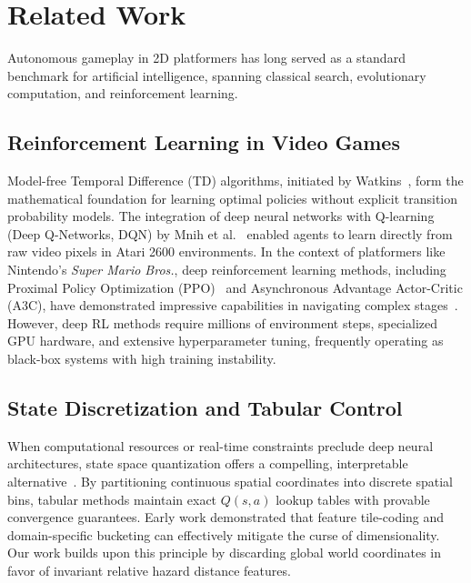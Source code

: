 \section{Related Work}
\label{sec:related}

Autonomous gameplay in 2D platformers has long served as a standard benchmark for artificial intelligence, spanning classical search, evolutionary computation, and reinforcement learning.

\subsection{Reinforcement Learning in Video Games}
Model-free Temporal Difference (TD) algorithms, initiated by Watkins~\cite{watkins1992q}, form the mathematical foundation for learning optimal policies without explicit transition probability models. The integration of deep neural networks with Q-learning (Deep Q-Networks, DQN) by Mnih et al.~\cite{mnih2015human} enabled agents to learn directly from raw video pixels in Atari 2600 environments. In the context of platformers like Nintendo's \textit{Super Mario Bros.}, deep reinforcement learning methods, including Proximal Policy Optimization (PPO)~\cite{schulman2017proximal} and Asynchronous Advantage Actor-Critic (A3C), have demonstrated impressive capabilities in navigating complex stages~\cite{khalid2024mario}. However, deep RL methods require millions of environment steps, specialized GPU hardware, and extensive hyperparameter tuning, frequently operating as black-box systems with high training instability.

\subsection{State Discretization and Tabular Control}
When computational resources or real-time constraints preclude deep neural architectures, state space quantization offers a compelling, interpretable alternative~\cite{sutton2018reinforcement}. By partitioning continuous spatial coordinates into discrete spatial bins, tabular methods maintain exact $Q(s, a)$ lookup tables with provable convergence guarantees. Early work demonstrated that feature tile-coding and domain-specific bucketing can effectively mitigate the curse of dimensionality. Our work builds upon this principle by discarding global world coordinates in favor of invariant relative hazard distance features.

